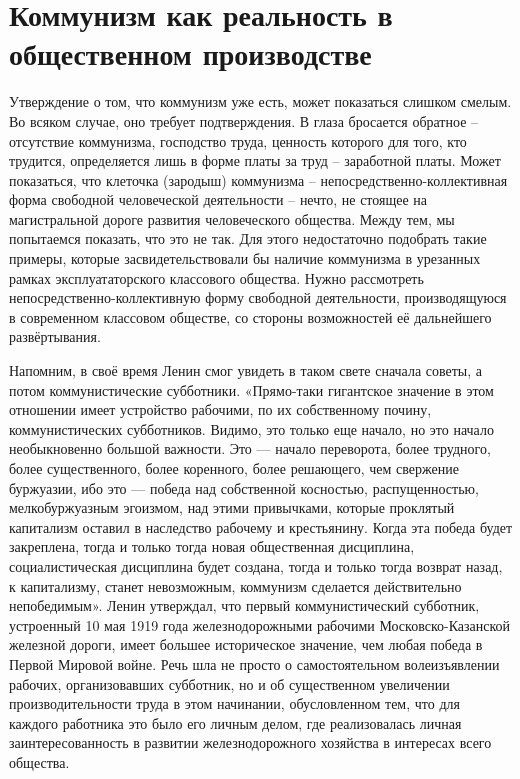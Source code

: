 \documentclass[../main]{subfiles}
\begin{document}
\ifSubfilesClassLoaded{\setcounter{page}{19}}{}
\section{Коммунизм как реальность в общественном производстве}
\label{sec:04_kommunizm_realnost}

Утверждение о том, что коммунизм уже есть, может показаться слишком смелым. Во всяком случае, оно требует подтверждения. В глаза бросается обратное – отсутствие коммунизма, господство труда, ценность которого для того, кто трудится, определяется лишь в форме платы за труд – заработной платы. Может показаться, что клеточка (зародыш) коммунизма – непосредственно-коллективная форма свободной человеческой деятельности – нечто, не стоящее на магистральной дороге развития человеческого общества. Между тем, мы попытаемся показать, что это не так. Для этого недостаточно подобрать такие примеры, которые засвидетельствовали бы наличие коммунизма в урезанных рамках эксплуататорского классового общества. Нужно рассмотреть непосредственно-коллективную форму свободной деятельности, производящуюся в современном классовом обществе, со стороны возможностей её дальнейшего развёртывания.

Напомним, в своё время Ленин смог увидеть в таком свете сначала советы, а потом коммунистические субботники. «Прямо-таки гигантское значение в этом отношении имеет устройство рабочими, по их собственному почину, коммунистических субботников. Видимо, это только еще начало, но это начало необыкновенно большой важности. Это — начало переворота, более трудного, более существенного, более коренного, более решающего, чем свержение буржуазии, ибо это — победа над собственной косностью, распущенностью, мелкобуржуазным эгоизмом, над этими привычками, которые проклятый капитализм оставил в наследство рабочему и крестьянину. Когда эта победа будет закреплена, тогда и только тогда новая общественная дисциплина, социалистическая дисциплина будет создана, тогда и только тогда возврат назад, к капитализму, станет невозможным, коммунизм сделается действительно непобедимым». Ленин утверждал, что первый коммунистический субботник, устроенный 10 мая 1919 года железнодорожными рабочими Московско-Казанской железной дороги, имеет большее историческое значение, чем любая победа в Первой Мировой войне. Речь шла не просто о самостоятельном волеизъявлении рабочих, организовавших субботник, но и об существенном увеличении производительности труда в этом начинании, обусловленном тем, что для каждого работника это было его личным делом, где реализовалась личная заинтересованность в развитии железнодорожного хозяйства в интересах всего общества.
\end{document}
